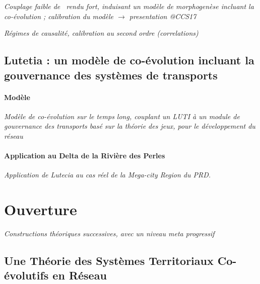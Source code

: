 
\textit{Couplage faible de~\cite{raimbault2016generation} rendu fort, induisant un modèle de morphogenèse incluant la co-évolution ; calibration du modèle $\rightarrow$ presentation @CCS17}

\textit{Régimes de causalité, calibration au second ordre (correlations)}



\subsection{Lutetia : un modèle de co-évolution incluant la gouvernance des systèmes de transports}

\paragraph{Modèle}

\textit{Modèle de co-évolution sur le temps long, couplant un LUTI à un module de gouvernance des transports basé sur la théorie des jeux, pour le développement du réseau~\cite{le2015modeling}}

\paragraph{Application au Delta de la Rivière des Perles}

\textit{Application de Lutecia au cas réel de la Mega-city Region du PRD.}





\section{Ouverture}




\textit{Constructions théoriques successives, avec un niveau meta progressif}

\subsection{Une Théorie des Systèmes Territoriaux Co-évolutifs en Réseau}

